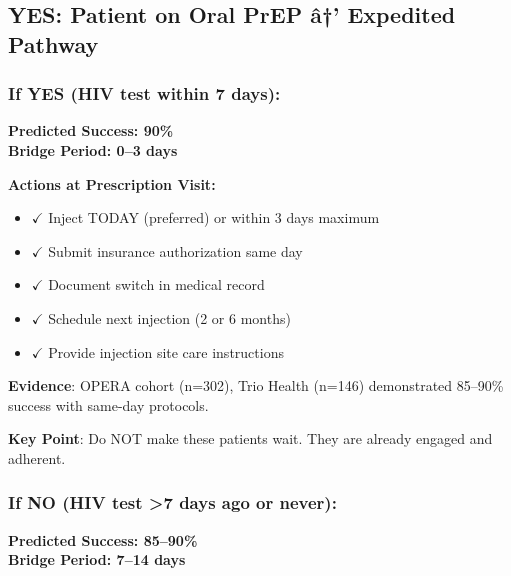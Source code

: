 \documentclass[11pt]{article}
\begin{document}
\subsection{YES: Patient on Oral PrEP â†’ Expedited Pathway}

\begin{tcolorbox}[colback=green!10!white,colframe=green!75!black,title=\textbf{Secondary Question: Recent HIV Test?},breakable]

\subsubsection{If YES (HIV test within 7 days):}

\begin{tcolorbox}[colback=green!20!white,colframe=green!75!black,title=* PRIORITY 1: Same-Day Switching Protocol]
\textbf{Predicted Success: 90\%} \\
\textbf{Bridge Period: 0--3 days}

\textbf{Actions at Prescription Visit:}
\begin{itemize}[leftmargin=*]
\item $\checkmark$ Inject TODAY (preferred) or within 3 days maximum
\item $\checkmark$ Submit insurance authorization same day
\item $\checkmark$ Document switch in medical record
\item $\checkmark$ Schedule next injection (2 or 6 months)
\item $\checkmark$ Provide injection site care instructions
\end{itemize}

\textbf{Evidence}: OPERA cohort (n=302), Trio Health (n=146) demonstrated 85--90\% success with same-day protocols.

\textbf{Key Point}: Do NOT make these patients wait. They are already engaged and adherent.
\end{tcolorbox}

\subsubsection{If NO (HIV test >7 days ago or never):}

\begin{tcolorbox}[colback=green!15!white,colframe=green!75!black,title=* PRIORITY 2: Rapid Transition Protocol]
\textbf{Predicted Success: 85--90\%} \\
\textbf{Bridge Period: 7--14 days}


\end{tcolorbox}
\end{tcolorbox}
\end{document}
